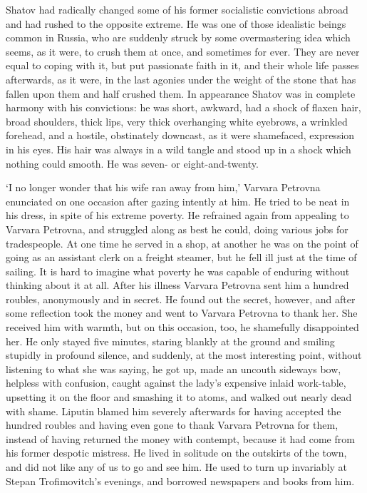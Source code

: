 \documentclass[12pt]{article}
\begin{document}
\vspace{12pt}
Shatov had radically changed some of his former socialistic convictions
abroad and had rushed to the opposite extreme. He was one of those
idealistic beings common in Russia, who are suddenly struck by some
overmastering idea which seems, as it were, to crush them at once, and
sometimes for ever. They are never equal to coping with it, but put
passionate faith in it, and their whole life passes afterwards, as it
were, in the last agonies under the weight of the stone that has fallen
upon them and half crushed them. In appearance Shatov was in complete
harmony with his convictions: he was short, awkward, had a shock of
flaxen hair, broad shoulders, thick lips, very thick overhanging white
eyebrows, a wrinkled forehead, and a hostile, obstinately downcast, as
it were shamefaced, expression in his eyes. His hair was always in a
wild tangle and stood up in a shock which nothing could smooth. He was
seven- or eight-and-twenty.


\vspace{12pt}
`I no longer wonder that his wife ran away from him,' Varvara Petrovna
enunciated on one occasion after gazing intently at him. He tried to be
neat in his dress, in spite of his extreme poverty. He refrained again
from appealing to Varvara Petrovna, and struggled along as best he
could, doing various jobs for tradespeople. At one time he served in a
shop, at another he was on the point of going as an assistant clerk on a
freight steamer, but he fell ill just at the time of sailing. It is
hard to imagine what poverty he was capable of enduring without thinking
about it at all. After his illness Varvara Petrovna sent him a hundred
roubles, anonymously and in secret. He found out the secret, however,
and after some reflection took the money and went to Varvara Petrovna to
thank her. She received him with warmth, but on this occasion, too,
he shamefully disappointed her. He only stayed five minutes, staring
blankly at the ground and smiling stupidly in profound silence, and
suddenly, at the most interesting point, without listening to what
she was saying, he got up, made an uncouth sideways bow, helpless
with confusion, caught against the lady's expensive inlaid work-table,
upsetting it on the floor and smashing it to atoms, and walked out
nearly dead with shame. Liputin blamed him severely afterwards for
having accepted the hundred roubles and having even gone to thank
Varvara Petrovna for them, instead of having returned the money with
contempt, because it had come from his former despotic mistress. He
lived in solitude on the outskirts of the town, and did not like any
of us to go and see him. He used to turn up invariably at Stepan
Trofimovitch's evenings, and borrowed newspapers and books from him.
\end{document}
